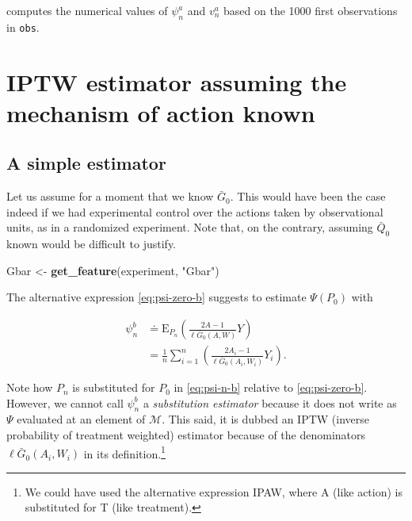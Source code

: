 \documentclass[11pt,openright,twoside]{book}
\newenvironment{Shaded}{\begin{snugshade}}{\end{snugshade}}
\newcommand{\KeywordTok}[1]{\textcolor[rgb]{0.13,0.29,0.53}{\textbf{#1}}}
\newcommand{\NormalTok}[1]{#1}
\newcommand{\StringTok}[1]{\textcolor[rgb]{0.31,0.60,0.02}{#1}}
\newcommand{\defq}{\doteq}
\newcommand{\calM}{\mathcal{M}}
\newcommand{\Exp}{\textrm{E}}
\newcommand{\Gbar}{\bar{G}}
\newcommand{\Qbar}{\bar{Q}}
\theoremstyle{definition}
\theoremstyle{definition}
\theoremstyle{definition}
\theoremstyle{remark}
\begin{document}
computes the numerical values of \(\psi_{n}^{a}\) and \(v_{n}^{a}\) based on the
1000 first observations in \texttt{obs}.

\hypertarget{known-gbar-first-pass}{%
\section{IPTW estimator assuming the mechanism of action known}\label{known-gbar-first-pass}}

\hypertarget{a-simple-estimator}{%
\subsection{A simple estimator}\label{a-simple-estimator}}

Let us assume for a moment that we know \(\Gbar_{0}\). This would have been the
case indeed if we had experimental control over the actions taken by observational units, as in a randomized experiment. Note that, on the
contrary, assuming \(\Qbar_{0}\) known would be difficult to justify.

\begin{Shaded}
\begin{Highlighting}[]
\NormalTok{Gbar <-}\StringTok{ }\KeywordTok{get_feature}\NormalTok{(experiment, }\StringTok{"Gbar"}\NormalTok{)}
\end{Highlighting}
\end{Shaded}

The alternative expression \eqref{eq:psi-zero-b} suggests to estimate
\(\Psi(P_{0})\) with

\begin{align}
\psi_{n}^{b}  &\defq \Exp_{P_{n}}  \left( \frac{2A-1}{\ell  \Gbar_{0}(A,W)} Y
\right) \\ 
&       =        \frac{1}{n}       \sum_{i=1}^{n}       \left(\frac{2A_{i}-1}{
\ell\Gbar_{0}(A_{i},W_{i})}Y_{i} \right). \label{eq:psi-n-b}
\end{align}

Note how \(P_{n}\) is substituted for \(P_{0}\) in \eqref{eq:psi-n-b} relative to
\eqref{eq:psi-zero-b}. However, we cannot call \(\psi_{n}^{b}\) a \emph{substitution
estimator} because it does not write as \(\Psi\) evaluated at an element of
\(\calM\). This said, it is dubbed an IPTW (inverse probability of treatment
weighted) estimator because of the denominators \(\ell\Gbar_{0}(A_{i},W_{i})\)
in its definition.\footnote{We could have used the alternative expression IPAW, where
  A (like action) is substituted for T (like treatment).}
\end{document}
